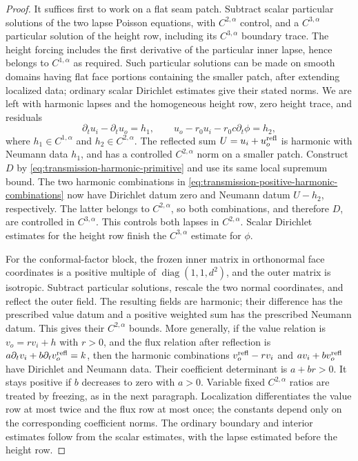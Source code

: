 \begin{proof}
It suffices first to work on a flat seam patch.  Subtract scalar
particular solutions of the two lapse Poisson equations, with
$C^{2,\alpha}$ control, and a $C^{3,\alpha}$ particular solution
of the height row, including its $C^{3,\alpha}$ boundary trace.
The height forcing includes the first derivative of the particular
inner lapse, hence belongs to $C^{1,\alpha}$ as required.  Such
particular solutions can be made on smooth domains having flat face
portions containing the smaller patch, after extending localized
data; ordinary scalar Dirichlet estimates give their stated norms.
We are left with harmonic lapses and the homogeneous height row,
zero height trace, and residuals
\begin{equation}
 \partial_tu_i-\partial_tu_o=h_1,
 \qquad u_o-r_0u_i-r_0c\partial_t\phi=h_2,
 \label{eq:transmission-inhomogeneous-seam}
\end{equation}
where $h_1\in C^{1,\alpha}$ and $h_2\in C^{2,\alpha}$.
The reflected sum $U=u_i+u_o^{\rm refl}$ is harmonic with Neumann
data $h_1$, and has a controlled $C^{2,\alpha}$ norm on a smaller
patch.  Construct $D$ by
\eqref{eq:transmission-harmonic-primitive} and use its same local
supremum bound.  The two harmonic combinations in
\eqref{eq:transmission-positive-harmonic-combinations} now have
Dirichlet datum zero and Neumann datum $U-h_2$, respectively.
The latter belongs to $C^{2,\alpha}$, so both combinations, and
therefore $D$, are controlled in $C^{3,\alpha}$.  This controls
both lapses in $C^{2,\alpha}$.  Scalar Dirichlet estimates for the
height row finish the $C^{3,\alpha}$ estimate for $\phi$.

For the conformal-factor block, the frozen inner matrix in orthonormal
face coordinates is a positive multiple of
$\operatorname{diag}(1,1,d^2)$, and the outer matrix is isotropic.
Subtract particular solutions, rescale the two normal coordinates,
and reflect the outer field.  The resulting fields are harmonic;
their difference has the prescribed value datum and a positive
weighted sum has the prescribed Neumann datum.  This gives their
$C^{2,\alpha}$ bounds.  More generally, if the value relation is
$v_o=r v_i+h$ with $r>0$, and the flux relation after reflection is
$a\partial_tv_i+b\partial_tv_o^{\rm refl}=k$, then the harmonic
combinations $v_o^{\rm refl}-rv_i$ and $av_i+bv_o^{\rm refl}$
have Dirichlet and Neumann data.  Their coefficient determinant is
$a+br>0$.  It stays positive if $b$ decreases to zero with $a>0$.
Variable fixed $C^{2,\alpha}$ ratios are treated by freezing, as in the
next paragraph.  Localization differentiates the value row at most
twice and the flux row at most once; the constants depend only on
the corresponding coefficient norms.  The ordinary boundary and interior estimates follow
from the scalar estimates, with the lapse estimated before the
height row.


\end{proof}
